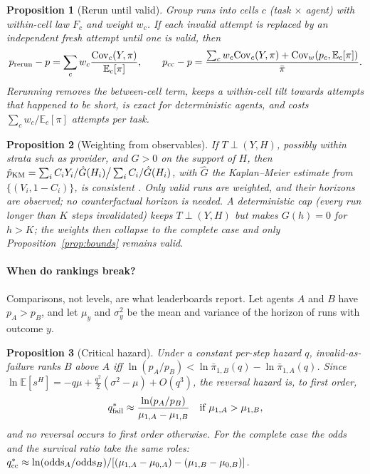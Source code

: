 \documentclass[11pt]{article}
\newtheorem{proposition}{Proposition}
\theoremstyle{definition}
\theoremstyle{remark}
\newcommand{\pb}{\bar\pi}
\newcommand{\E}{\mathbb{E}}
\begin{document}
\begin{proposition}[Rerun until valid]\label{prop:rerun}
Group runs into cells $c$ (task $\times$ agent) with within-cell law $F_c$ and
weight $w_c$. If each invalid attempt is replaced by an independent fresh
attempt until one is valid, then
\[
p_{\rm rerun}-p=\sum_cw_c\frac{{\rm Cov}_c(Y,\pi)}{\E_c[\pi]},\qquad
p_{\rm cc}-p=\frac{\sum_cw_c{\rm Cov}_c(Y,\pi)+{\rm Cov}_w(p_c,\E_c[\pi])}{\pb}.
\]
Rerunning removes the between-cell term, keeps a within-cell tilt towards
attempts that happened to be short, is exact for deterministic agents, and costs
$\sum_cw_c/\E_c[\pi]$ attempts per task.
\end{proposition}

\begin{proposition}[Weighting from observables]\label{prop:km}
If $T\perp(Y,H)$, possibly within strata such as provider, and $G>0$ on the
support of $H$, then
$\hat p_{\rm KM}=\sum_iC_iY_i/\hat G(H_i)\big/\sum_iC_i/\hat G(H_i)$, with
$\hat G$ the Kaplan--Meier estimate from $\{(V_i,1-C_i)\}$, is consistent
\citep{kaplan1958nonparametric,robins2000correcting,satten2001kaplan}. Only
valid runs are weighted, and their horizons are observed; no counterfactual
horizon is needed. A deterministic cap (every run longer than $K$ steps
invalidated) keeps $T\perp(Y,H)$ but makes $G(h)=0$ for $h>K$; the weights then
collapse to the complete case and only Proposition~\ref{prop:bounds} remains
valid.
\end{proposition}

\paragraph{When do rankings break?} Comparisons, not levels, are what
leaderboards report. Let agents $A$ and $B$ have $p_A>p_B$, and let $\mu_{y}$ and
$\sigma^2_{y}$ be the mean and variance of the horizon of runs with outcome $y$.

\begin{proposition}[Critical hazard]\label{prop:critical}
Under a constant per-step hazard $q$, invalid-as-failure ranks $B$ above $A$ iff
$\ln(p_A/p_B)<\ln\pb_{1,B}(q)-\ln\pb_{1,A}(q)$. Since
$\ln\E[s^H]=-q\mu+\tfrac{q^2}{2}(\sigma^2-\mu)+O(q^3)$, the reversal hazard is,
to first order,
\[
q^*_{\rm fail}\approx\frac{\ln(p_A/p_B)}{\mu_{1,A}-\mu_{1,B}}
\quad\text{if }\mu_{1,A}>\mu_{1,B},
\]
and no reversal occurs to first order otherwise. For the complete case the
odds and the survival ratio take the same roles:
$q^*_{\rm cc}\approx\ln(\mathrm{odds}_A/\mathrm{odds}_B)/
[(\mu_{1,A}-\mu_{0,A})-(\mu_{1,B}-\mu_{0,B})]$.
\end{proposition}
\end{document}
